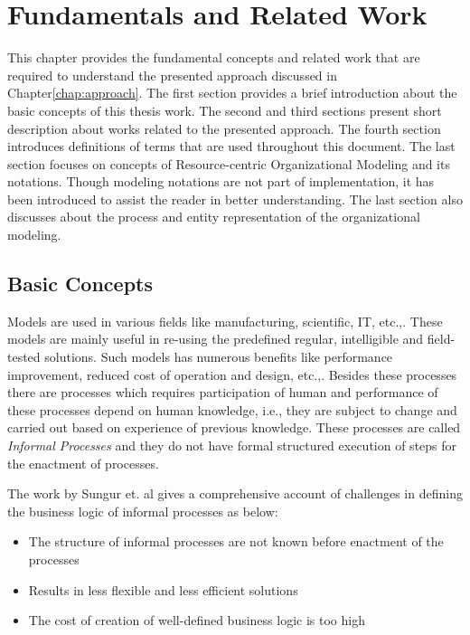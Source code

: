 \chapter{Fundamentals and Related Work}
\label{chap:fundamentals}
This chapter provides the fundamental concepts and related work that are required to understand the presented approach discussed in Chapter\ref{chap:approach}. The first section provides a brief introduction about the basic concepts of this thesis work. The second and third sections present short description about  works related to the presented approach. The fourth section introduces definitions of terms that are used throughout this document. The last section focuses on concepts of Resource-centric Organizational Modeling and its notations. Though modeling notations are not part of implementation, it has been introduced to assist the reader in better understanding. The last section also discusses about the process and entity representation of the organizational modeling.  

\section{Basic Concepts}
\label{sec:basicconcepts}
Models are used in various fields like manufacturing, scientific, IT, etc.,. These models are mainly useful in re-using the predefined regular, intelligible and field-tested solutions. Such models has numerous benefits like performance improvement, reduced cost of operation and design, etc.,. Besides these processes there are processes which requires participation of human and performance of these  processes depend on human knowledge, i.e., they are subject to change and carried out based on experience of previous knowledge. These processes are called \textit{Informal Processes} and they do not have formal structured execution of steps for the enactment of processes. 

The work by Sungur et. al \cite{Sungur2014a} gives a comprehensive account of challenges in defining the business logic of informal processes as below:

\begin{itemize}
	\item The structure of informal processes are not known before enactment of the processes
	\item Results in less flexible and less efficient solutions
	\item The cost of creation of well-defined business logic is too high
\end{itemize}


